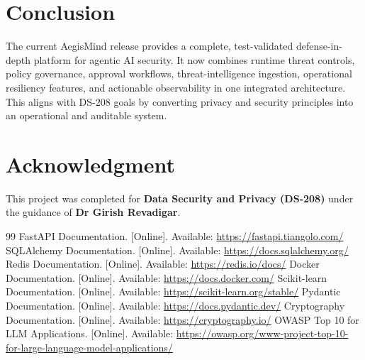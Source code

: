 \documentclass[conference]{IEEEtran}
\begin{document}
\section{Conclusion}
The current AegisMind release provides a complete, test-validated defense-in-depth platform for agentic AI security. It now combines runtime threat controls, policy governance, approval workflows, threat-intelligence ingestion, operational resiliency features, and actionable observability in one integrated architecture. This aligns with DS-208 goals by converting privacy and security principles into an operational and auditable system.

\section*{Acknowledgment}
This project was completed for \textbf{Data Security and Privacy (DS-208)} under the guidance of \textbf{Dr Girish Revadigar}.

\begin{thebibliography}{99}
 FastAPI Documentation. [Online]. Available: \url{https://fastapi.tiangolo.com/}
 SQLAlchemy Documentation. [Online]. Available: \url{https://docs.sqlalchemy.org/}
 Redis Documentation. [Online]. Available: \url{https://redis.io/docs/}
 Docker Documentation. [Online]. Available: \url{https://docs.docker.com/}
 Scikit-learn Documentation. [Online]. Available: \url{https://scikit-learn.org/stable/}
 Pydantic Documentation. [Online]. Available: \url{https://docs.pydantic.dev/}
 Cryptography Documentation. [Online]. Available: \url{https://cryptography.io/}
 OWASP Top 10 for LLM Applications. [Online]. Available: \url{https://owasp.org/www-project-top-10-for-large-language-model-applications/}
\end{thebibliography}
\end{document}
